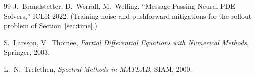 \documentclass[10pt,a4paper]{article}
\begin{document}
\begin{thebibliography}{99}
J.~Brandstetter, D.~Worrall, M.~Welling, ``Message Passing Neural PDE
Solvers,'' ICLR 2022. (Training-noise and pushforward mitigations for the
rollout problem of Section~\ref{sec:time}.)

S.~Larsson, V.~Thomee, \emph{Partial Differential Equations with Numerical
Methods}, Springer, 2003.

L.~N.~Trefethen, \emph{Spectral Methods in MATLAB}, SIAM, 2000.
\end{thebibliography}
\end{document}
